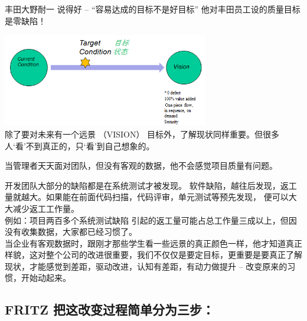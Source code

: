 丰田大野耐一 说得好 -- ``容易达成的目标不是好目标''
他对丰田员工设的质量目标是零缺陷！

\includegraphics[width=9cm]{mubiaozhungt.jpg}\\
除了要对未来有一个远景 （VISION）
目标外，了解现状同样重要。但很多人`看'不到真正的，只`看'到自己想象的。


当管理者天天面对团队，但没有客观的数据，他不会感觉项目质量有问题。

开发团队大部分的缺陷都是在系统测试才被发现。
软件缺陷，越往后发现，返工量就越大。如果能在前面代码扫描，代码评审，单元测试等预先发现，
便可以大大减少返工工作量。\\
例如：项目两百多个系统测试缺陷
引起的返工量可能占总工作量三成以上，但因没有收集数据，大家都已经习惯了。\\
当企业有客观数据时，跟刚才那些学生看一些远景的真正颜色一样，他才知道真正样貌，这对整个公司的改进很重要，我们不仅仅是要定目标，更重要是要真正了解现状，才能感觉到差距，驱动改进，认知有差距，有动力做提升
-- 改变原来的习惯，开始动起来。

\hypertarget{fritz-ux628aux8fd9ux6539ux53d8ux8fc7ux7a0bux7b80ux5355ux5206ux4e3aux4e09ux6b65}{%
\subsection{FRITZ
把这改变过程简单分为三步：}\label{fritz-ux628aux8fd9ux6539ux53d8ux8fc7ux7a0bux7b80ux5355ux5206ux4e3aux4e09ux6b65}}

